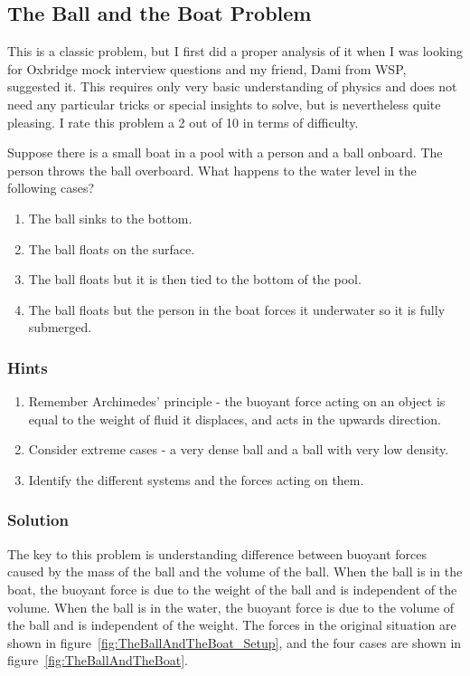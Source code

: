 \subsection{The Ball and the Boat Problem}

This is a classic problem, but I first did a proper analysis of it when I was looking for Oxbridge mock interview questions and my friend, Dami from WSP, suggested it. This requires only very basic understanding of physics and does not need any particular tricks or special insights to solve, but is nevertheless quite pleasing. I rate this problem a 2 out of 10 in terms of difficulty.

Suppose there is a small boat in a pool with a person and a ball onboard. The person throws the ball overboard. What happens to the water level in the following cases?

\begin{enumerate}
    \item The ball sinks to the bottom.
    \item The ball floats on the surface.
    \item The ball floats but it is then tied to the bottom of the pool.
    \item The ball floats but the person in the boat forces it underwater so it is fully submerged.
\end{enumerate}

\subsubsection{Hints}

\begin{enumerate}
    \item Remember Archimedes' principle - the buoyant force acting on an object is equal to the weight of fluid it displaces, and acts in the upwards direction.
    \item Consider extreme cases - a very dense ball and a ball with very low density.
    \item Identify the different systems and the forces acting on them.
\end{enumerate}

\subsubsection{Solution}

The key to this problem is understanding difference between buoyant forces caused by the mass of the ball and the volume of the ball. When the ball is in the boat, the buoyant force is due to the weight of the ball and is independent of the volume. When the ball is in the water, the buoyant force is due to the volume of the ball and is independent of the weight. The forces in the original situation are shown in figure~\ref{fig:TheBallAndTheBoat_Setup}, and the four cases are shown in figure~\ref{fig:TheBallAndTheBoat}.

